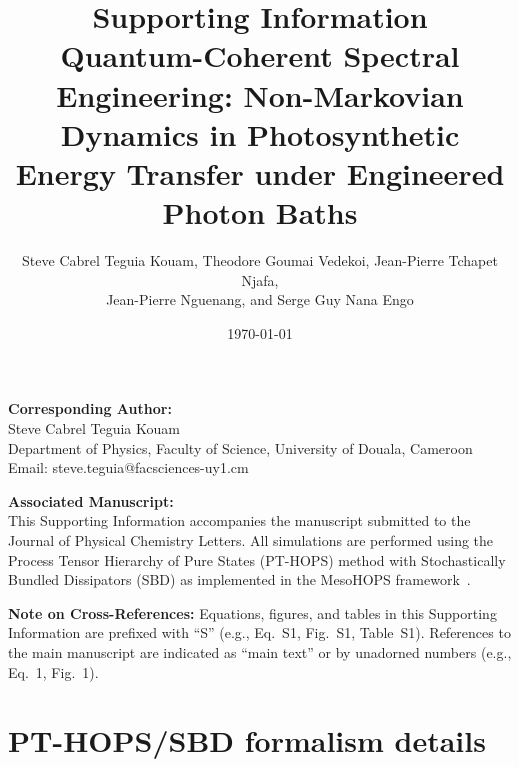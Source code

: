 \documentclass[11pt,a4paper]{article}
\begin{document}
\title{\textbf{Supporting Information}\\[0.5em]
\large Quantum-Coherent Spectral Engineering: Non-Markovian Dynamics in Photosynthetic Energy Transfer under Engineered Photon Baths}

\author{Steve Cabrel Teguia Kouam, Theodore Goumai Vedekoi, Jean-Pierre Tchapet Njafa,\\ Jean-Pierre Nguenang, and Serge Guy Nana Engo}

\date{\today}

\maketitle

\noindent\textbf{Corresponding Author:}\\
Steve Cabrel Teguia Kouam\\
Department of Physics, Faculty of Science, University of Douala, Cameroon\\
Email: steve.teguia@facsciences-uy1.cm

\vspace{1em}
\noindent\textbf{Associated Manuscript:}\\
This Supporting Information accompanies the manuscript submitted to the Journal of Physical Chemistry Letters. All simulations are performed using the Process Tensor Hierarchy of Pure States (PT-HOPS) method with Stochastically Bundled Dissipators (SBD) as implemented in the MesoHOPS framework~\cite{Varvelo2021a,Citty2024a}.

\tableofcontents

\newpage

\noindent\textbf{Note on Cross-References:} Equations, figures, and tables in this Supporting Information are prefixed with ``S'' (e.g., Eq.~S1, Fig.~S1, Table~S1). References to the main manuscript are indicated as ``main text'' or by unadorned numbers (e.g., Eq.~1, Fig.~1).

\vspace{1em}


\section{PT-HOPS/SBD formalism details}
\label{sec:formalism}
\end{document}
